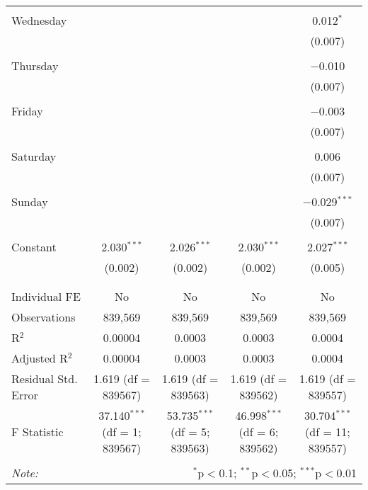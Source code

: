 \documentclass[
]{article}
\begin{document}
\begin{table}[!htbp]
{\begin{tabular}{@{\extracolsep{5pt}}lcccc}
  & & & & \\ 
 Wednesday &  &  &  & 0.012$^{*}$ \\ 
  &  &  &  & (0.007) \\ 
  & & & & \\ 
 Thursday &  &  &  & $-$0.010 \\ 
  &  &  &  & (0.007) \\ 
  & & & & \\ 
 Friday &  &  &  & $-$0.003 \\ 
  &  &  &  & (0.007) \\ 
  & & & & \\ 
 Saturday &  &  &  & 0.006 \\ 
  &  &  &  & (0.007) \\ 
  & & & & \\ 
 Sunday &  &  &  & $-$0.029$^{***}$ \\ 
  &  &  &  & (0.007) \\ 
  & & & & \\ 
 Constant & 2.030$^{***}$ & 2.026$^{***}$ & 2.030$^{***}$ & 2.027$^{***}$ \\ 
  & (0.002) & (0.002) & (0.002) & (0.005) \\ 
  & & & & \\ 
\hline \\[-1.8ex] 
Individual FE & No & No & No & No \\ 
Observations & 839,569 & 839,569 & 839,569 & 839,569 \\ 
R$^{2}$ & 0.00004 & 0.0003 & 0.0003 & 0.0004 \\ 
Adjusted R$^{2}$ & 0.00004 & 0.0003 & 0.0003 & 0.0004 \\ 
Residual Std. Error & 1.619 (df = 839567) & 1.619 (df = 839563) & 1.619 (df = 839562) & 1.619 (df = 839557) \\ 
F Statistic & 37.140$^{***}$ (df = 1; 839567) & 53.735$^{***}$ (df = 5; 839563) & 46.998$^{***}$ (df = 6; 839562) & 30.704$^{***}$ (df = 11; 839557) \\ 
\hline 
\hline \\[-1.8ex] 
\textit{Note:}  & \multicolumn{4}{r}{$^{*}$p$<$0.1; $^{**}$p$<$0.05; $^{***}$p$<$0.01} \\ 
\end{tabular}
} 
\end{table} 
\newpage
\end{document}
